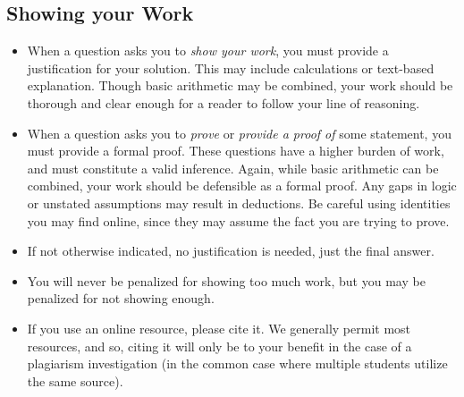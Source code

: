 \subsection*{Showing your Work}
\begin{itemize}
    \item When a question asks you to \emph{show your work}, you must provide a justification for your solution. This may include calculations or text-based explanation. Though basic arithmetic may be combined, your work should be thorough and clear enough for a reader to follow your line of reasoning.
    \item When a question asks you to \emph{prove} or \emph{provide a proof of} some statement, you must provide a formal proof. These questions have a higher burden of work, and must constitute a valid inference. Again, while basic arithmetic can be combined, your work should be defensible as a formal proof. Any gaps in logic or unstated assumptions may result in deductions. Be careful using identities you may find online, since they may assume the fact you are trying to prove.
    \item If not otherwise indicated, no justification is needed, just the final answer.
    \item You will never be penalized for showing too much work, but you may be penalized for not showing enough.
    \item If you use an online resource, please cite it. We generally permit most resources, and so, citing it will only be to your benefit in the case of a plagiarism investigation (in the common case where multiple students utilize the same source).
\end{itemize}
